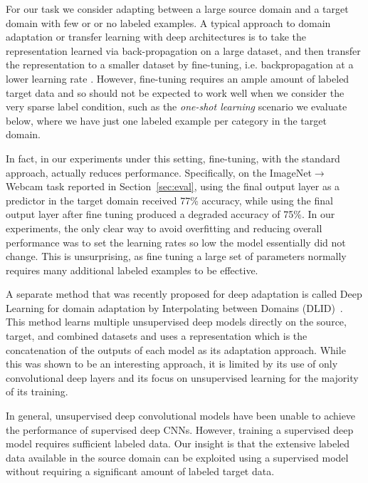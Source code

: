 \label{sec:decaf}
For our task we consider adapting between a large source domain and a target domain with few or or no labeled examples. 
A typical approach to domain adaptation or transfer learning with deep architectures is to take the representation learned via back-propagation on a large dataset, and then transfer the representation to a smaller dataset by fine-tuning, i.e. backpropagation at a lower learning rate \cite{rcnn,zeiler-arxiv-2013}.
However, fine-tuning requires an ample amount of labeled target data and so should not be expected to work well when we consider the very sparse label condition, such as the \textit{one-shot learning} scenario we evaluate below, where we have just one labeled example per category in the target domain.

In fact, in our experiments under this setting, fine-tuning, with the standard approach, actually reduces performance.
Specifically, on the ImageNet$\rightarrow$Webcam task reported in Section~\ref{sec:eval}, using the final output layer as a predictor in the target domain received 77\% accuracy, while using the final output layer after fine tuning produced a degraded accuracy of 75\%. In our experiments, the only clear way to avoid overfitting and reducing overall performance was to set the learning rates so low the model essentially did not change. This is unsurprising, as fine tuning a large set of parameters normally requires many additional labeled examples to be effective.

A separate method that was recently proposed for deep adaptation is called Deep Learning for domain adaptation by Interpolating between Domains (DLID)~\cite{ref:dlid}. This method learns multiple unsupervised deep models directly on the source, target, and combined datasets and uses a representation which is the concatenation of the outputs of each model as its adaptation approach. 
While this was shown to be an interesting approach, it is limited by its use of only convolutional deep layers and its focus on unsupervised learning for the majority of its training.

In general, unsupervised deep convolutional models have been unable to achieve the performance of supervised deep CNNs. However, training a supervised deep model requires sufficient labeled data. Our insight is that the extensive labeled data available in the source domain can be exploited using a supervised model without requiring a significant amount of labeled target data.



